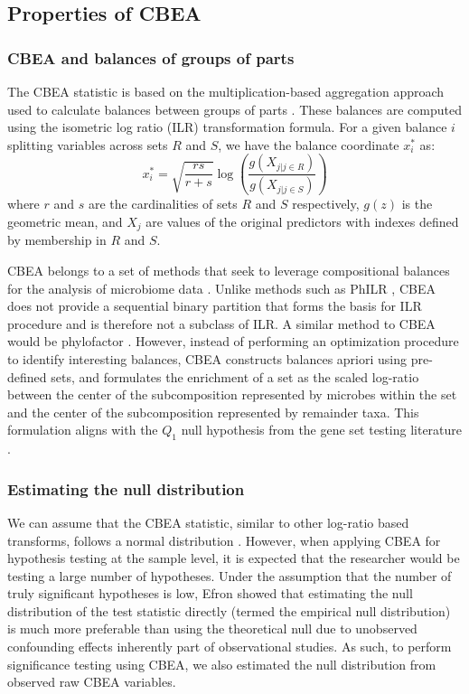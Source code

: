 \documentclass[10pt,letterpaper]{article}
\begin{document}
\subsection*{Properties of CBEA}
\subsubsection*{CBEA and balances of groups of parts}
The CBEA statistic is based on the multiplication-based aggregation approach used to calculate balances between groups of parts \cite{egozcue2005}. These balances are computed using the isometric log ratio (ILR) transformation \cite{egozcue2003} formula. For a given balance $i$ splitting variables across sets $R$ and $S$, we have the balance coordinate $x^{*}_{i}$ as: 
\begin{equation}\label{ilr_standard}
    x^{*}_i = \sqrt{\frac{rs}{r+s}} \log\left(\frac{g(X_{j|j \in R})}{g(X_{j|j \in S})}\right)
\end{equation}
where $r$ and $s$ are the cardinalities of sets $R$ and $S$ respectively, $g(z)$ is the geometric mean, and $X_{j}$ are values of the original predictors with indexes defined by membership in $R$ and $S$. 

CBEA belongs to a set of methods that seek to leverage compositional balances for the analysis of microbiome data \cite{washburne2017, rivera-pinto2018, silverman2017, morton2017}. Unlike methods such as PhILR \cite{silverman2017}, CBEA does not provide a sequential binary partition that forms the basis for ILR procedure \cite{egozcue2003} and is therefore not a subclass of ILR. A similar method to CBEA would be phylofactor \cite{washburne2017}. However, instead of performing an optimization procedure to identify interesting balances, CBEA constructs balances apriori using pre-defined sets, and formulates the enrichment of a set as the scaled log-ratio between the center of the subcomposition represented by microbes within the set and the center of the subcomposition represented by remainder taxa. This formulation aligns with the $Q_1$ null hypothesis from the gene set testing literature \cite{tian2005}. 

\subsubsection*{Estimating the null distribution}
We can assume that the CBEA statistic, similar to other log-ratio based transforms, follows a normal distribution \cite{egozcue2003, aitchison1980}. However, when applying CBEA for hypothesis testing at the sample level, it is expected that the researcher would be testing a large number of hypotheses. Under the assumption that the number of truly significant hypotheses is low, Efron \cite{efron2004} showed that estimating the null distribution of the test statistic directly (termed the empirical null distribution) is much more preferable than using the theoretical null due to unobserved confounding effects inherently part of observational studies. As such, to perform significance testing using CBEA, we also estimated the null distribution from observed raw CBEA variables. 
\end{document}
